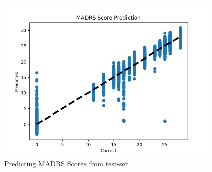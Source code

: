 \begin{figure}
      \includegraphics[height=8cm]{img/madrs_prediction/plot_testset.png}
      \caption{Predicting MADRS Scores from test-set}
      \label{figure:madrs_prediction_testset}
\end{figure}


